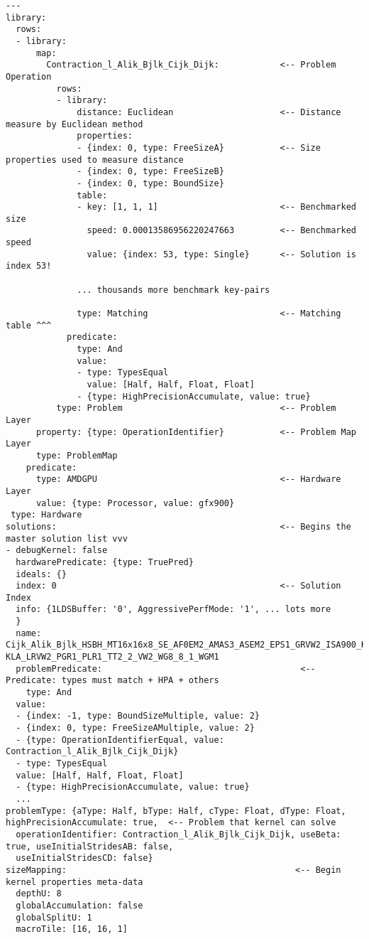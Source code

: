 \documentclass[]{article}
\begin{document}
\begin{verbatim}
---
library:
  rows:
  - library:
      map:
        Contraction_l_Alik_Bjlk_Cijk_Dijk:            <-- Problem Operation 
          rows:
          - library:
              distance: Euclidean                     <-- Distance measure by Euclidean method
              properties:
              - {index: 0, type: FreeSizeA}           <-- Size properties used to measure distance
              - {index: 0, type: FreeSizeB}    
              - {index: 0, type: BoundSize}
              table:
              - key: [1, 1, 1]                        <-- Benchmarked size
                speed: 0.00013586956220247663         <-- Benchmarked speed
                value: {index: 53, type: Single}      <-- Solution is index 53!

              ... thousands more benchmark key-pairs

              type: Matching                          <-- Matching table ^^^
            predicate: 
              type: And
              value:
              - type: TypesEqual                      
                value: [Half, Half, Float, Float]        
              - {type: HighPrecisionAccumulate, value: true}
          type: Problem                               <-- Problem Layer
      property: {type: OperationIdentifier}           <-- Problem Map Layer
      type: ProblemMap
    predicate:
      type: AMDGPU                                    <-- Hardware Layer
      value: {type: Processor, value: gfx900}
 type: Hardware
solutions:                                            <-- Begins the master solution list vvv
- debugKernel: false                                      
  hardwarePredicate: {type: TruePred}
  ideals: {}
  index: 0                                            <-- Solution Index
  info: {1LDSBuffer: '0', AggressivePerfMode: '1', ... lots more
  }
  name: Cijk_Alik_Bjlk_HSBH_MT16x16x8_SE_AF0EM2_AMAS3_ASEM2_EPS1_GRVW2_ISA900_K1_ KLA_LRVW2_PGR1_PLR1_TT2_2_VW2_WG8_8_1_WGM1
  problemPredicate:                                       <-- Predicate: types must match + HPA + others
    type: And
  value:
  - {index: -1, type: BoundSizeMultiple, value: 2}
  - {index: 0, type: FreeSizeAMultiple, value: 2}
  - {type: OperationIdentifierEqual, value: Contraction_l_Alik_Bjlk_Cijk_Dijk}
  - type: TypesEqual
  value: [Half, Half, Float, Float]
  - {type: HighPrecisionAccumulate, value: true}
  ...
problemType: {aType: Half, bType: Half, cType: Float, dType: Float, highPrecisionAccumulate: true,  <-- Problem that kernel can solve
  operationIdentifier: Contraction_l_Alik_Bjlk_Cijk_Dijk, useBeta: true, useInitialStridesAB: false,
  useInitialStridesCD: false}
sizeMapping:                                             <-- Begin kernel properties meta-data 
  depthU: 8
  globalAccumulation: false
  globalSplitU: 1
  macroTile: [16, 16, 1]


\end{verbatim}
\end{document}
